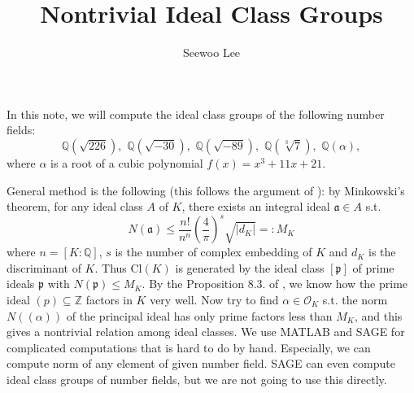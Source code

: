 \documentclass{article}
\title{Nontrivial Ideal Class Groups}
\author{Seewoo Lee}
\newcommand{\Cl}{\mathrm{Cl}}
\begin{document}
\maketitle

In this note, we will compute the ideal class groups of the following number fields:
$$
\mathbb{Q}(\sqrt{226}), \,\,\mathbb{Q}(\sqrt{-30}), \,\, \mathbb{Q}(\sqrt{-89}),\,\,\mathbb{Q}(\sqrt[3]{7}),\,\,\mathbb{Q}(\alpha),
$$
where $\alpha$ is a root of a cubic polynomial $f(x) =x^{3} + 11x + 21$. 

General method is the following (this follows the argument of \cite{concl}): by Minkowski's theorem, for any ideal class $A$ of $K$, there exists an integral ideal $\mathfrak{a}\in A$ s.t. 
$$
N(\mathfrak{a})\leq \frac{n!}{n^{n}}\left(\frac{4}{\pi}\right)^{s}\sqrt{|d_{K}|}=:M_{K}
$$
where $n = [K:\mathbb{Q}]$, $s$ is the number of complex embedding of $K$ and $d_{K}$ is the discriminant of $K$. 
Thus $\Cl(K)$ is generated by the ideal class $[\mathfrak{p}]$ of prime ideals $\mathfrak{p}$ with $N(\mathfrak{p})\leq M_{K}$. 
By the Proposition 8.3. of \cite{neu}, we know how the prime ideal $(p)\subseteq \mathbb{Z}$ factors in $K$ very well. 
Now try to find $\alpha\in \mathcal{O}_{K}$ s.t. the norm $N((\alpha))$ of the principal ideal has only prime factors less than $M_{K}$, and this gives a nontrivial relation among ideal classes. 
We use MATLAB and SAGE for complicated computations that is hard to do by hand. 
Especially, we can compute norm of any element of given number field. SAGE can even compute ideal class groups of number fields, but we are not going to use this directly. 
\end{document}
